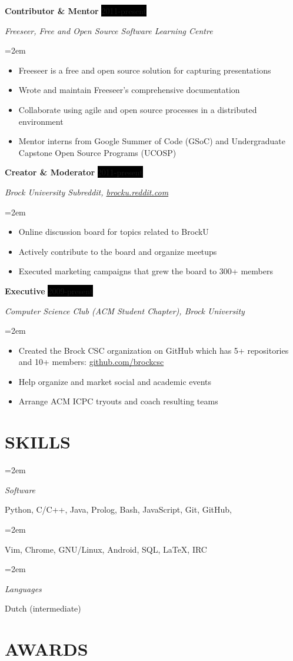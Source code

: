 \documentclass[paper=a4,fontsize=11pt]{scrartcl} %
\newlength{\spacebox}
\newcommand{\sepspace}{\vspace*{1em}}		%
\newcommand{\NewPart}[1]{\section*{\uppercase{#1}}}
\newcommand{\PersonalEntry}[2]{
		\noindent\hangindent=2em\hangafter=0 %
		\parbox{\spacebox}{        %
		\textit{#1}}		       %
		\hspace{1.5em} #2 \par}    %
\newcommand{\SkillsEntry}[2]{      %
		\noindent\hangindent=2em\hangafter=0 %
		\parbox{\spacebox}{        %
		\textit{#1}}			   %
		\hspace{1.5em} #2 \par}    %
\newcommand{\EducationEntry}[4]{
		\noindent \textbf{#1} \hfill      %
		\colorbox{Black}{%
			\parbox{8.0em}{%
			\hfill\color{White}#2}} \par  %
		\noindent \textit{#3} \par        %
		\noindent\hangindent=2em\hangafter=0 \small #4 %
		\normalsize \par}
\newcommand{\OrganizationEntry}[4]{		  %
		\noindent \textbf{#1} \hfill      %
		\colorbox{Black}{\color{White}#2} \par  %
		\noindent \textit{#3} \par              %
		\noindent\hangindent=2em\hangafter=0 \small #4 %
		\normalsize \par}
\begin{document}
\OrganizationEntry{Contributor \& Mentor}{2011-present}
{Freeseer, Free and Open Source Software Learning Centre}
{
 \begin{itemize} \itemsep -1pt %
   \item Freeseer is a free and open source solution for capturing presentations
   \item Wrote and maintain Freeseer's comprehensive documentation
   \item Collaborate using agile and open source processes in a distributed environment
   \item Mentor interns from Google Summer of Code (GSoC) and Undergraduate Capstone Open Source Programs (UCOSP)
 \end{itemize}
}
\sepspace

\OrganizationEntry{Creator \& Moderator}{2011-present}
{Brock University Subreddit, \url{brocku.reddit.com}}
{
 \begin{itemize} \itemsep -1pt
   \item Online discussion board for topics related to BrockU
   \item Actively contribute to the board and organize meetups
   \item Executed marketing campaigns that grew the board to 300+ members
 \end{itemize}
}
\sepspace

\OrganizationEntry{Executive}{2009-present}
{Computer Science Club (ACM Student Chapter), Brock University}
{
 \begin{itemize} \itemsep -1pt
   \item Created the Brock CSC organization on GitHub which has 5+ repositories and 10+ members:
\url{github.com/brockcsc}
   \item Help organize and market social and academic events
   \item Arrange ACM ICPC tryouts and coach resulting teams
 \end{itemize}
}

\NewPart{Skills}{}

\SkillsEntry{Software}{Python, C/C++, Java, Prolog, Bash,
JavaScript, Git, GitHub,}
\SkillsEntry{}{Vim, Chrome, GNU/Linux, Android, SQL, \LaTeX, IRC}
\sepspace
\SkillsEntry{Languages}{Dutch (intermediate)}

\NewPart{Awards}{}
\end{document}
